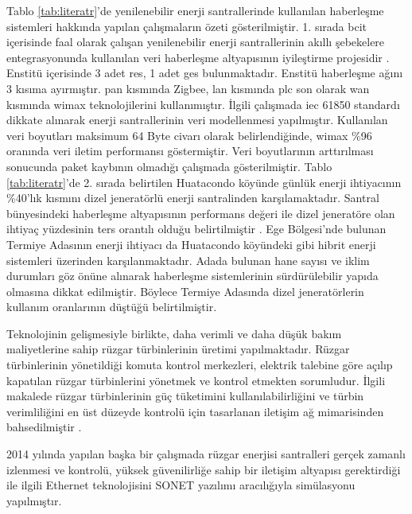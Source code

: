 Tablo \ref{tab:literatr}'de yenilenebilir enerji santrallerinde kullanılan haberleşme sistemleri hakkında yapılan çalışmaların özeti gösterilmiştir. 1. sırada \gls{bcit} içerisinde faal olarak çalışan yenilenebilir enerji santrallerinin akıllı şebekelere entegrasyonunda kullanılan veri haberleşme altyapısının iyileştirme projesidir \cite{BCIT}. Enstitü içerisinde 3 adet \gls{res}, 1 adet \gls{ges} bulunmaktadır. Enstitü haberleşme ağını 3 kısıma ayırmıştır. \gls{pan} kısmında Zigbee, \gls{lan} kısmında \gls{plc} son olarak \gls{wan} kısmında \gls{wimax} teknolojilerini kullanımıştır. İlgili çalışmada \gls{iec} 61850 standardı dikkate alınarak enerji santrallerinin veri modellenmesi yapılmıştır. Kullanılan veri boyutları maksimum 64 Byte civarı olarak belirlendiğinde, \gls{wimax} \%96 oranında veri iletim performansı göstermiştir. Veri boyutlarının arttırılması sonucunda paket kaybının olmadığı çalışmada gösterilmiştir. Tablo \ref{tab:literatr}'de 2. sırada belirtilen Huatacondo köyünde günlük enerji ihtiyacının \%40'lık kısmını dizel jeneratörlü enerji santralinden karşılamaktadır. Santral bünyesindeki haberleşme altyapısının performans değeri ile dizel jeneratöre olan ihtiyaç yüzdesinin ters orantılı olduğu belirtilmiştir \cite{microgrid_siliOrnek}. Ege Bölgesi'nde bulunan Termiye Adasının enerji ihtiyacı da Huatacondo köyündeki gibi hibrit enerji sistemleri üzerinden karşılanmaktadır. Adada bulunan hane sayısı ve iklim durumları göz önüne alınarak haberleşme sistemlerinin sürdürülebilir yapıda olmasına dikkat edilmiştir. Böylece Termiye Adasında dizel jeneratörlerin kullanım oranlarının düştüğü belirtilmiştir\cite{yunanOrnek}.



Teknolojinin gelişmesiyle birlikte, daha verimli ve daha düşük bakım maliyetlerine sahip rüzgar türbinlerinin üretimi yapılmaktadır. Rüzgar türbinlerinin yönetildiği komuta kontrol merkezleri, elektrik talebine göre açılıp kapatılan rüzgar türbinlerini yönetmek ve kontrol etmekten sorumludur. İlgili makalede rüzgar türbinlerinin güç tüketimini kullanılabilirliğini ve türbin verimliliğini en üst düzeyde kontrolü için tasarlanan iletişim ağ mimarisinden bahsedilmiştir \cite{ahmed2014communication}.

2014 yılında yapılan başka bir çalışmada \cite{hussain2014multilayer} rüzgar enerjisi santralleri gerçek zamanlı izlenmesi ve kontrolü, yüksek güvenilirliğe sahip bir iletişim altyapısı gerektirdiği ile ilgili Ethernet teknolojisini SONET yazılımı aracılığıyla simülasyonu yapılmıştır.

